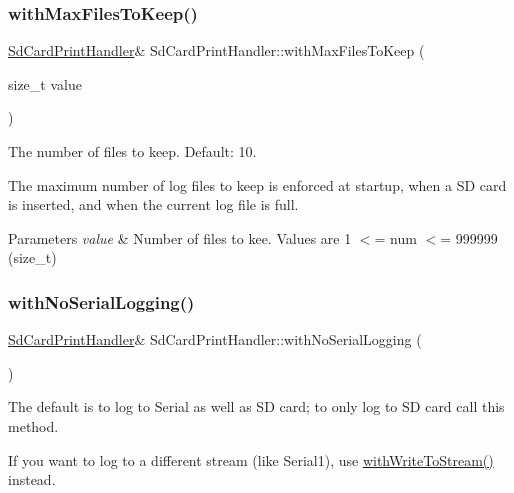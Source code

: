 \subsubsection{\texorpdfstring{with\+Max\+Files\+To\+Keep()}{withMaxFilesToKeep()}}
{\footnotesize\ttfamily \mbox{\hyperlink{class_sd_card_print_handler}{Sd\+Card\+Print\+Handler}}\& Sd\+Card\+Print\+Handler\+::with\+Max\+Files\+To\+Keep (\begin{DoxyParamCaption}\item[{size\+\_\+t}]{value }\end{DoxyParamCaption})\hspace{0.3cm}{\ttfamily [inline]}}



The number of files to keep. Default\+: 10. 

The maximum number of log files to keep is enforced at startup, when a SD card is inserted, and when the current log file is full.


\begin{DoxyParams}{Parameters}
{\em value} & Number of files to kee. Values are 1 $<$= num $<$= 999999 (size\+\_\+t) \\
\hline
\end{DoxyParams}
\mbox{\label{class_sd_card_print_handler_a4c3cac5a8a622e51ce43d5942dc47c7a}} 
\subsubsection{\texorpdfstring{with\+No\+Serial\+Logging()}{withNoSerialLogging()}}
{\footnotesize\ttfamily \mbox{\hyperlink{class_sd_card_print_handler}{Sd\+Card\+Print\+Handler}}\& Sd\+Card\+Print\+Handler\+::with\+No\+Serial\+Logging (\begin{DoxyParamCaption}{ }\end{DoxyParamCaption})\hspace{0.3cm}{\ttfamily [inline]}}



The default is to log to Serial as well as SD card; to only log to SD card call this method. 

If you want to log to a different stream (like Serial1), use \mbox{\hyperlink{class_sd_card_print_handler_acdb2ef1ae77acdfd9c3d355548c94750}{with\+Write\+To\+Stream()}} instead. \mbox{\label{class_sd_card_print_handler_a9172a9620d575738e1387005e16759f9}} 
